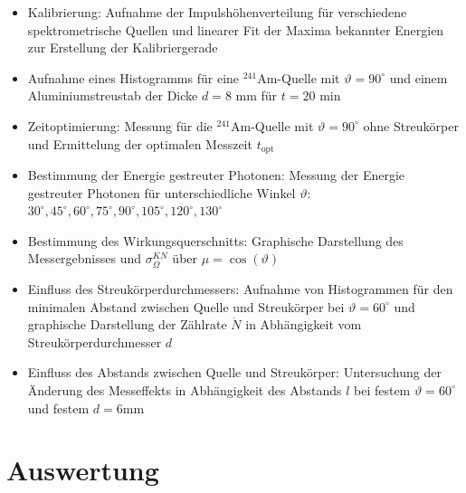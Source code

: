 \documentclass[german,  %
parskip=full,  %
]{scrartcl}
\begin{document}
\begin{itemize}
\item Kalibrierung: Aufnahme der Impulshöhenverteilung für verschiedene spektrometrische Quellen und linearer Fit der Maxima bekannter Energien zur Erstellung der Kalibriergerade
\item Aufnahme eines Histogramms für eine $^{241}$Am-Quelle mit $\vartheta = 90^{\circ}$ und einem Aluminiumstreustab der Dicke $d=8$ mm für $t = 20$ min
\item Zeitoptimierung: Messung für die $^{241}$Am-Quelle mit $\vartheta = 90^{\circ}$ ohne Streukörper und Ermittelung der optimalen Messzeit $t_{\text{opt}}$
\item Bestimmung der Energie gestreuter Photonen: Messung der Energie gestreuter Photonen für unterschiedliche Winkel $\vartheta$: $30^{\circ}, 45^{\circ}, 60^{\circ}, 75^{\circ}, 90^{\circ}, 105^{\circ}, 120^{\circ}, 130^{\circ}$
\item Bestimmung des Wirkungsquerschnitts: Graphische Darstellung des Messergebnisses und $\sigma_{\Omega}^{KN}$ über $\mu = \cos(\vartheta)$
\item Einfluss des Streukörperdurchmessers: Aufnahme von Histogrammen für den minimalen Abstand zwischen Quelle und Streukörper bei $\vartheta= 60^{\circ}$ und graphische Darstellung der Zählrate $\dot{N}$ in Abhängigkeit vom Streukörperdurchmesser $d$
\item Einfluss des Abstands zwischen Quelle und Streukörper: Untersuchung der Änderung des Messeffekts in Abhängigkeit des Abstands $l$ bei festem $\vartheta = 60^{\circ}$ und festem $d= 6$mm
\end{itemize}

\section{Auswertung}
\end{document}
